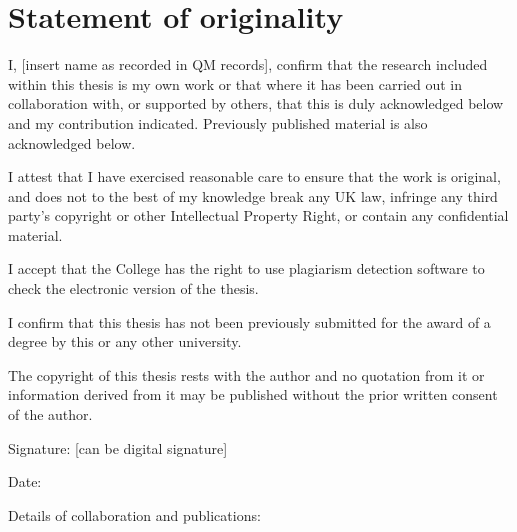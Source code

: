 \chapter*{Statement of originality}
\label{C:Statement}

I, [insert name as recorded in QM records], confirm that the research included
within this thesis is my own work or that where it has been carried out in
collaboration with, or supported by others, that this is duly acknowledged
below and my contribution indicated. Previously published material is also
acknowledged below.

\bigskip

\noindent
I attest that I have exercised reasonable care to ensure that the work is
original, and does not to the best of my knowledge break any UK law, infringe
any third party’s copyright or other Intellectual Property Right, or contain any
confidential material.

\bigskip

\noindent
I accept that the College has the right to use plagiarism detection software to
check the electronic version of the thesis.

\bigskip

\noindent
I confirm that this thesis has not been previously submitted for the award of a
degree by this or any other university.

\bigskip

\noindent
The copyright of this thesis rests with the author and no quotation from it or
information derived from it may be published without the prior written consent
of the author.

\bigskip

\noindent
Signature: [can be digital signature]

\noindent
Date:

\bigskip

\noindent
Details of collaboration and publications: 

